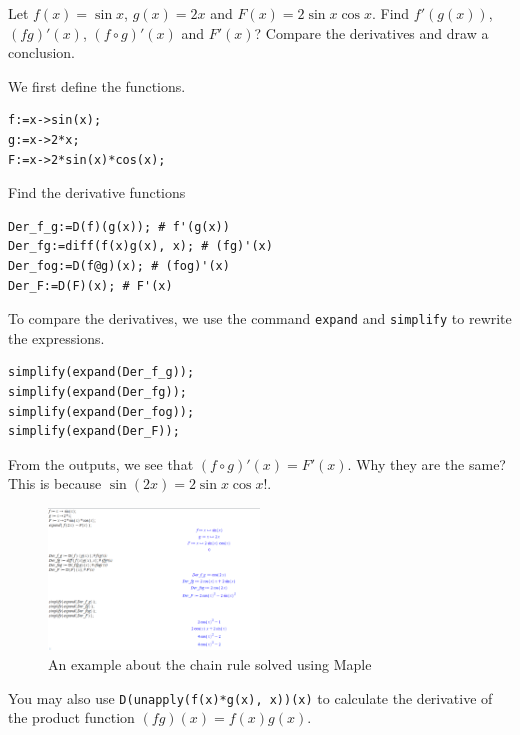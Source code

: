 \documentclass[
  en,11pt,simple]{elegantbook}
\renewenvironment{example}[1][]{
  \refstepcounter{exam}
  \par\noindent\textbf{\color{main}{\examplename} \theexam #1}
  \rmfamily
}{
  \par\ignorespacesafterend
}
\begin{document}
\begin{example}

Let \(f(x)=\sin x\), \(g(x)=2x\) and \(F(x)=2\sin x\cos x\). Find \(f'(g(x))\), \((fg)'(x)\), \((f\circ g)'(x)\) and \(F'(x)\)?
Compare the derivatives and draw a conclusion.
\end{example}

\begin{solution}
{}
We first define the functions.

\begin{verbatim}
f:=x->sin(x);
g:=x->2*x;
F:=x->2*sin(x)*cos(x);
\end{verbatim}

Find the derivative functions

\begin{verbatim}
Der_f_g:=D(f)(g(x)); # f'(g(x))
Der_fg:=diff(f(x)g(x), x); # (fg)'(x)
Der_fog:=D(f@g)(x); # (fog)'(x)
Der_F:=D(F)(x); # F'(x)
\end{verbatim}

To compare the derivatives, we use the command \texttt{expand} and \texttt{simplify} to rewrite the expressions.

\begin{verbatim}
simplify(expand(Der_f_g));
simplify(expand(Der_fg));
simplify(expand(Der_fog));
simplify(expand(Der_F));
\end{verbatim}

From the outputs, we see that \((f\circ g)'(x)=F'(x)\). Why they are the same? This is because \(\sin(2x)=2\sin x\cos x\)!.

\begin{figure}
\centering
\includegraphics[width=0.5\textwidth,height=\textheight]{figs/chain_rule.png}
\caption{An example about the chain rule solved using Maple}
\end{figure}
\end{solution}

\begin{remark}
{}
You may also use \texttt{D(unapply(f(x)*g(x),\ x))(x)} to calculate the derivative of the product function \((fg)(x)=f(x)g(x)\).
\end{remark}
\end{document}
